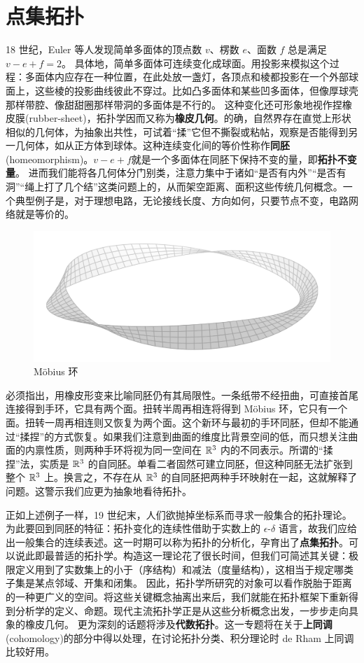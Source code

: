 \chapter{点集拓扑}\label{appx:topo}

18 世纪，Euler 等人发现简单多面体的顶点数 $v$、楞数 $e$、面数 $f$ 总是满足 $v-e+f=2$。
具体地，简单多面体可连续变化成球面。用投影来模拟这个过程：多面体内应存在一种位置，在此处放一盏灯，各顶点和棱都投影在一个外部球面上，这些棱的投影曲线彼此不穿过。比如凸多面体和某些凹多面体，但像厚球壳那样带腔、像甜甜圈那样带洞的多面体是不行的。
这种变化还可形象地视作捏橡皮膜(rubber-sheet)，拓扑学因而又称为\textbf{橡皮几何}。的确，自然界存在直觉上形状相似的几何体，为抽象出共性，可试着“揉”它但不撕裂或粘帖，观察是否能得到另一几何体，如从正方体到球体。这种连续变化间的等价性称作\textbf{同胚}(homeomorphism)。$v-e+f$就是一个多面体在同胚下保持不变的量，即\textbf{拓扑不变量}。
进而我们能将各几何体分门别类，注意力集中于诸如“是否有内外”“是否有洞”“绳上打了几个结”这类问题上的，从而架空距离、面积这些传统几何概念。一个典型例子是，对于理想电路，无论接线长度、方向如何，只要节点不变，电路网络就是等价的。

\begin{figure}[ht]
    \centering
    \includegraphics[width=.8\textwidth]{fig/appx/Mobius.png}
    \caption{M\"obius 环}\label{mobius}
\end{figure}

必须指出，用橡皮形变来比喻同胚仍有其局限性。一条纸带不经扭曲，可直接首尾连接得到手环，它具有两个面。扭转半周再相连将得到 M\"obius 环，它只有一个面。扭转一周再相连则又恢复为两个面。这个新环与最初的手环同胚，但却不能通过“揉捏”的方式恢复。如果我们注意到曲面的维度比背景空间的低，而只想关注曲面的内禀性质，则两种手环将视为同⼀空间在 $\mathbb{R}^3$ 内的不同表⽰。所谓的“揉捏”法，实质是 $\mathbb{R}^3$ 的⾃同胚。单看⼆者固然可建⽴同胚，但这种同胚⽆法扩张到整个 $\mathbb{R}^3$ 上。换言之，不存在从 $\mathbb{R}^3$ 的自同胚把两种手环映射在一起，这就解释了问题。这警示我们应更为抽象地看待拓扑。

正如上述例子一样，19 世纪末，人们欲抛掉坐标系而寻求一般集合的拓扑理论。为此要回到同胚的特征：拓扑变化的连续性借助于实数上的 $\epsilon$-$\delta$ 语言，故我们应给出一般集合的连续表述。这一时期可以称为拓扑的分析化，孕育出了\textbf{点集拓扑}。可以说此即最普适的拓扑学。构造这一理论花了很长时间，但我们可简述其关键：极限定义用到了实数集上的小于（序结构）和减法（度量结构），这相当于规定哪类子集是某点邻域、开集和闭集。
因此，拓扑学所研究的对象可以看作脱胎于距离的一种更广义的空间。将这些关键概念抽离出来后，我们就能在拓扑框架下重新得到分析学的定义、命题。现代主流拓扑学正是从这些分析概念出发，一步步走向具象的橡皮几何。
更为深刻的话题将涉及\textbf{代数拓扑}。这一专题将在关于\textbf{上同调}(cohomology)的部分中得以处理，在讨论拓扑分类、积分理论时 de Rham 上同调比较好用。

